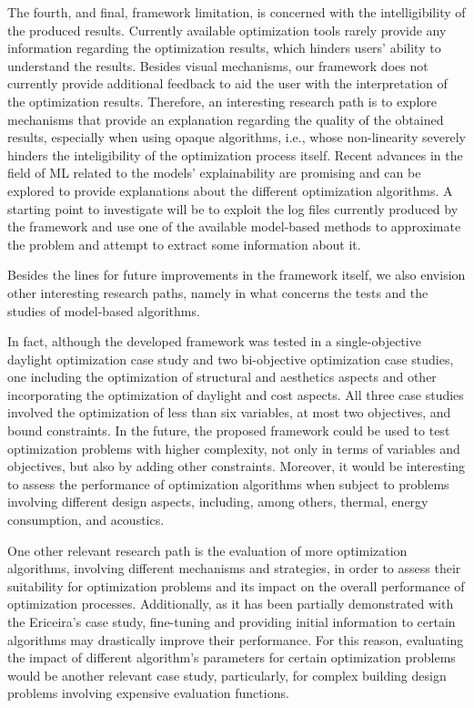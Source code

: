 The fourth, and final, framework limitation, is concerned with the intelligibility of the produced results. Currently available optimization tools rarely provide any information regarding the optimization results, which hinders users' ability to understand the results. Besides visual mechanisms, our framework does not currently provide additional feedback to aid the user with the interpretation of the optimization results. Therefore, an interesting research path is to explore mechanisms that provide an explanation regarding the quality of the obtained results, especially when using opaque algorithms, i.e., whose non-linearity severely hinders the inteligibility of the optimization process itself. Recent advances in the field of \ac{ML} related to the models' explainability are promising and can be explored to provide explanations about the different optimization algorithms. A starting point to investigate will be to exploit the log files currently produced by the framework and use one of the available model-based methods to approximate the problem and attempt to extract some information about it.

Besides the lines for future improvements in the framework itself, we also envision other interesting research paths, namely in what concerns the tests and the studies of model-based algorithms. 

In fact, although the developed framework was tested in a single-objective daylight optimization case study and two bi-objective optimization case studies, one including the optimization of structural and aesthetics aspects and other incorporating the optimization of daylight and cost aspects. All three case studies involved the optimization of less than six variables, at most two objectives, and bound constraints. In the future, the proposed framework could be used to test optimization problems with higher complexity, not only in terms of variables and objectives, but also by adding other constraints. Moreover, it would be interesting to assess the performance of optimization algorithms when subject to problems involving different design aspects, including, among others, thermal, energy consumption, and acoustics. 
 
One other relevant research path is the evaluation of more optimization algorithms, involving different mechanisms and strategies, in order to assess their suitability for optimization problems and its impact on the overall performance of optimization processes. Additionally, as it has been partially demonstrated with the Ericeira's case study, fine-tuning and providing initial information to certain algorithms may drastically improve their performance. For this reason, evaluating the impact of different algorithm's parameters for certain optimization problems would be another relevant case study, particularly, for complex building design problems involving expensive evaluation functions. 

